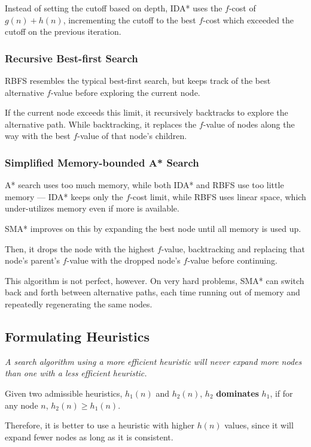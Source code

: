 \begin{multicols*}{2}
            Instead of setting the cutoff based on depth, IDA* uses the $f$-cost of $g(n) + h(n)$, incrementing the cutoff to the best $f$-cost which exceeded the cutoff on the previous iteration.

            \subsubsection{Recursive Best-first Search}
            RBFS resembles the typical best-first search, but keeps track of the best alternative $f$-value before exploring the current node.

            If the current node exceeds this limit, it recursively backtracks to explore the alternative path. While backtracking, it replaces the $f$-value of nodes along the way with the best $f$-value of that node's children.

            \subsubsection{Simplified Memory-bounded A* Search}
            A* search uses too much memory, while both IDA* and RBFS use too little memory --- IDA* keeps only the $f$-cost limit, while RBFS uses linear space, which under-utilizes memory even if more is available.

            SMA* improves on this by expanding the best node until all memory is used up.

            Then, it drops the node with the highest $f$-value, backtracking and replacing that node's parent's $f$-value with the dropped node's $f$-value before continuing.

            This algorithm is not perfect, however. On very hard problems, SMA* can switch back and forth between alternative paths, each time running out of memory and repeatedly regenerating the same nodes.

        \subsection{Formulating Heuristics}
            \emph{A search algorithm using a more efficient heuristic will never expand more nodes than one with a less efficient heuristic.}

            Given two admissible heuristics, $h_1(n)$ and $h_2(n)$, $h_2$ \textbf{dominates} $h_1$, if for any node $n$, $h_2(n) \ge h_1(n)$.

            Therefore, it is better to use a heuristic with higher $h(n)$ values, since it will expand fewer nodes as long as it is consistent.


\end{multicols*}
